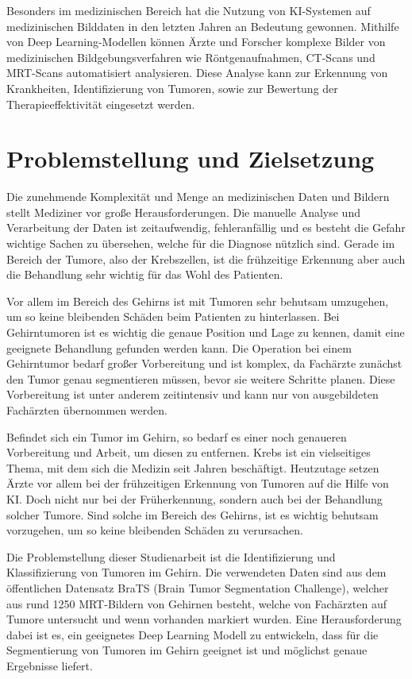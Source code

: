 Besonders im medizinischen Bereich hat die Nutzung von \ac{KI}-Systemen auf medizinischen Bilddaten in den letzten Jahren an Bedeutung gewonnen. Mithilfe von Deep Learning-Modellen können Ärzte und Forscher komplexe Bilder von medizinischen Bildgebungsverfahren wie Röntgenaufnahmen, CT-Scans und MRT-Scans automatisiert analysieren. Diese Analyse kann zur Erkennung von Krankheiten, Identifizierung von Tumoren, sowie zur Bewertung der Therapieeffektivität eingesetzt werden. 


\section{Problemstellung und Zielsetzung}
Die zunehmende Komplexität und Menge an medizinischen Daten und Bildern stellt Mediziner vor große Herausforderungen. Die manuelle Analyse und Verarbeitung der Daten ist zeitaufwendig, fehleranfällig und es besteht die Gefahr wichtige Sachen zu übersehen, welche für die Diagnose nützlich sind.
Gerade im Bereich der Tumore, also der Krebszellen, ist die frühzeitige Erkennung aber auch die Behandlung sehr wichtig für das Wohl des Patienten. 

Vor allem im Bereich des Gehirns ist mit Tumoren sehr behutsam umzugehen, um so keine bleibenden Schäden beim Patienten zu hinterlassen. Bei Gehirntumoren ist es wichtig die genaue Position und Lage zu kennen, damit eine geeignete Behandlung gefunden werden kann. Die Operation bei einem Gehirntumor bedarf großer Vorbereitung und ist komplex, da Fachärzte zunächst den Tumor genau segmentieren müssen, bevor sie weitere Schritte planen. Diese Vorbereitung ist unter anderem zeitintensiv und kann nur von ausgebildeten Fachärzten übernommen werden. 

Befindet sich ein Tumor im Gehirn, so bedarf es einer noch genaueren Vorbereitung und Arbeit, um diesen zu entfernen. 
Krebs ist ein vielseitiges Thema, mit dem sich die Medizin seit Jahren beschäftigt. Heutzutage setzen Ärzte vor allem bei der frühzeitigen Erkennung von Tumoren auf die Hilfe von \ac{KI}. Doch nicht nur bei der Früherkennung, sondern auch bei der Behandlung solcher Tumore. Sind solche im Bereich des Gehirns, ist es wichtig behutsam vorzugehen, um so keine bleibenden Schäden zu verursachen.

Die Problemstellung dieser Studienarbeit ist die Identifizierung und Klassifizierung von Tumoren im Gehirn. Die verwendeten Daten sind aus dem öffentlichen Datensatz BraTS (Brain Tumor Segmentation Challenge), welcher aus rund 1250 \ac{MRT}-Bildern von Gehirnen besteht, welche von Fachärzten auf Tumore untersucht und wenn vorhanden markiert wurden. Eine Herausforderung dabei ist es, ein geeignetes Deep Learning \gls{Modell} zu entwickeln, dass für die Segmentierung von Tumoren im Gehirn geeignet ist und möglichst genaue Ergebnisse liefert.  

